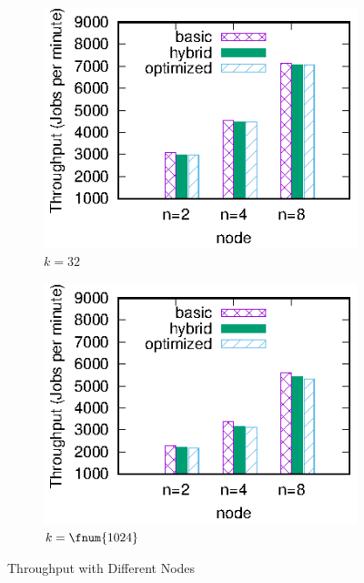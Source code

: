 \begin{figure}[t]
  \centering
  \begin{subfigure}[t]{.4\linewidth}
    \centering
    \includegraphics[width=\linewidth]{exp-figs/knn/throughput32.eps}
    \caption{$k=32$}\label{fig:knn:throughput:32}
  \end{subfigure}\quad%
  \begin{subfigure}[t]{.4\linewidth}
    \centering
    \includegraphics[width=\linewidth]{exp-figs/knn/throughput1024.eps}
    \caption{$k=\fnum{1024}$}\label{fig:knn:throughput:1024}
  \end{subfigure}
  \caption{Throughput with Different Nodes}\label{fig:knn:throughput}
\end{figure}

